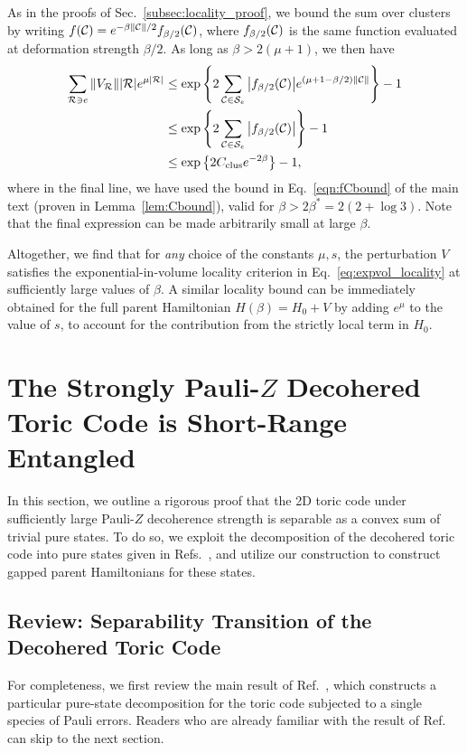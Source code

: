 As in the proofs of Sec.~\ref{subsec:locality_proof}, we bound the sum over clusters by writing $f(\mathcal{C}) = e^{-\beta \norm{\mathcal{C}} / 2} f_{\beta / 2}(\mathcal{C})$, where $f_{\beta / 2}(\mathcal{C})$ is the same function evaluated at deformation strength $\beta / 2$. As long as $\beta > 2 (\mu + 1)$, we then have
\begin{equation}
    \begin{split}
        \sum_{\mathcal{R} \ni e} \norm{V_{\mathcal{R}}} |\mathcal{R}| e^{\mu |\mathcal{R}|} &\leq \exp \qty{ 2 \sum_{\mathcal{C}\in \mathcal{S}_e} \abs{f_{\beta / 2}(\mathcal{C})} e^{(\mu + 1 - \beta/2) \norm{\mathcal{C}}} } - 1 \\
        &\leq \exp \qty{ 2 \sum_{\mathcal{C}\in \mathcal{S}_e} \abs{f_{\beta / 2}(\mathcal{C})} } - 1 \\
        &\leq \exp \qty{ 2 C_{\mathrm{clus}}e^{-2\beta} } - 1 ,
    \end{split}
\end{equation}
where in the final line, we have used the bound in Eq.~\eqref{eqn:fCbound} of the main text (proven in Lemma~\ref{lem:Cbound}), valid for $\beta > 2\beta^* = 2(2 + \log 3)$. Note that the final expression can be made arbitrarily small at large $\beta$.

Altogether, we find that for \emph{any} choice of the constants $\mu, s$, the perturbation $V$ satisfies the exponential-in-volume locality criterion in Eq.~\eqref{eq:expvol_locality} at sufficiently large values of $\beta$. A similar locality bound can be immediately obtained for the full parent Hamiltonian $H(\beta) = H_0 + V$ by adding $e^{\mu}$ to the value of $s$, to account for the contribution from the strictly local term in $H_0$.



\section{The Strongly Pauli-\texorpdfstring{$Z$}{Z} Decohered Toric Code is Short-Range Entangled}
In this section, we outline a rigorous proof that the 2D toric code under sufficiently large Pauli-$Z$ decoherence strength is separable as a convex sum of trivial pure states. To do so, we exploit the decomposition of the decohered toric code into pure states given in Refs.~, and utilize our construction to construct gapped parent Hamiltonians for these states. 

\subsection{Review: Separability Transition of the Decohered Toric Code}
For completeness, we first review the main result of Ref.~, which constructs a particular pure-state decomposition for the toric code subjected to a single species of Pauli errors. Readers who are already familiar with the result of Ref.~ can skip to the next section.

